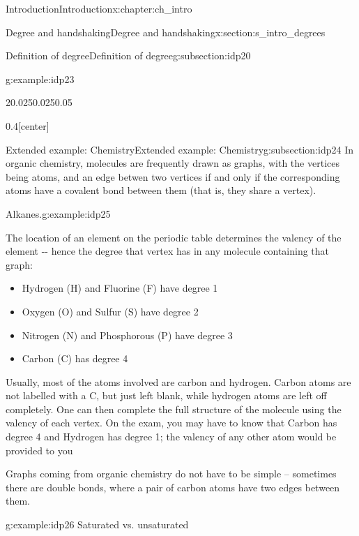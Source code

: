 \documentclass[oneside,10pt,]{book}
\numberwithin{equation}{section}
\begin{document}
\begin{chapterptx}{Introduction}{}{Introduction}{}{}{x:chapter:ch_intro}
\begin{sectionptx}{Degree and handshaking}{}{Degree and handshaking}{}{}{x:section:s_intro_degrees}
\begin{subsectionptx}{Definition of degree}{}{Definition of degree}{}{}{g:subsection:idp20}
\begin{example}{}{g:example:idp23}
\begin{sidebyside}{2}{0.025}{0.025}{0.05}
\begin{sbspanel}{0.4}[center]
{
}%
\end{sbspanel}%
\end{sidebyside}%
\end{example}
\end{subsectionptx}
%
%
\typeout{************************************************}
\typeout{************************************************}
%
\begin{subsectionptx}{Extended example: Chemistry}{}{Extended example: Chemistry}{}{}{g:subsection:idp24}
In organic chemistry, molecules are frequently drawn as graphs, with the vertices being atoms, and an edge betwen two vertices if and only if the corresponding atoms have a covalent bond between them (that is, they share a vertex).%
\begin{example}{Alkanes.}{g:example:idp25}%
\end{example}
The location of an element on the periodic table determines the valency of the element -{}-{} hence the degree that vertex has in any molecule containing that graph:%
%
\begin{itemize}[label=\textbullet]
\item{}Hydrogen (H) and Fluorine (F) have degree 1%
\item{}Oxygen (O) and Sulfur (S) have degree 2%
\item{}Nitrogen (N) and Phosphorous (P) have degree 3%
\item{}Carbon (C) has degree 4%
\end{itemize}
Usually, most of the atoms involved are carbon and hydrogen. Carbon atoms are not labelled with a C, but just left blank, while hydrogen atoms are left off completely. One can then complete the full structure of the molecule using the valency of each vertex.  On the exam, you may have to know that Carbon has degree 4 and Hydrogen has degree 1; the valency of any other atom would be provided to you%
\par
Graphs coming from organic chemistry do not have to be simple – sometimes there are double bonds, where a pair of carbon atoms have two edges between them.%
\begin{example}{}{g:example:idp26}%
Saturated vs. unsaturated\end{example}

\end{subsectionptx}
\end{sectionptx}
\end{chapterptx}
\end{document}
